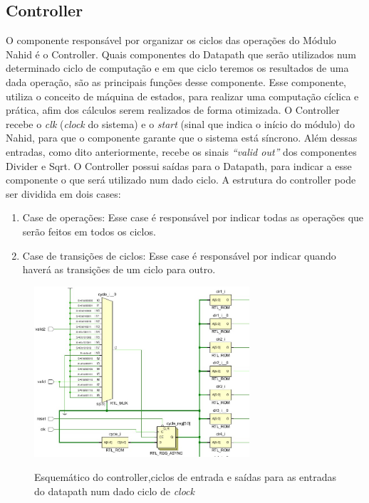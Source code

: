 \subsection{Controller}
O componente responsável por organizar os ciclos das operações do Módulo Nahid é o Controller. Quais componentes do Datapath que serão utilizados num determinado ciclo de computação e em que ciclo teremos os resultados de uma dada operação, são as principais funções desse componente. Esse componente, utiliza o conceito de máquina de estados, para realizar uma computação cíclica e prática, afim dos cálculos serem realizados de forma otimizada. O Controller recebe o \textit{clk} (\textit{clock} do sistema) e o \textit{start} (sinal que indica o início do módulo) do Nahid, para que o componente garante que o sistema está síncrono. Além dessas entradas, como dito anteriormente, recebe os sinais \textit{“valid out”} dos componentes Divider e Sqrt. O Controller possui saídas para o Datapath, para indicar a esse componente o que será utilizado num dado ciclo. A estrutura do controller pode ser dividida em dois cases:
\begin{enumerate}
	\item Case de operações: Esse case é responsável por indicar todas as operações que serão feitos em todos os ciclos. 
	\item Case de transições de ciclos: Esse case é responsável por indicar quando haverá as transições de um ciclo para outro.
\end{enumerate} 

\begin{figure}[H]
	\centering
	\includegraphics[width=8cm]{figures/controller.jpg}\\
	\caption{Esquemático do controller,ciclos de entrada e saídas para as  entradas do datapath num dado  ciclo de \textit{clock}}
	\label{ciclos}
\end{figure}


